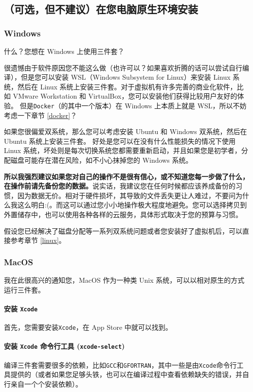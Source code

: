 \documentclass[a4paper]{ctexart}
\begin{document}
\subsection{（可选，但不建议）在您电脑原生环境安装}
\subsubsection{Windows}
什么？您想在 Windows 上使用三件套？

很遗憾由于软件原因您不能这么做（也许可以？如果喜欢折腾的话可以尝试自行编译），但是您可以安装 WSL（Windows Subsystem for Linux）来安装 Linux 系统，然后在 Linux 系统上安装三件套。对于虚拟机有许多完善的商业化软件，比如 VMware Workstation 和 VirtualBox，您可以安装他们获得比较用户友好的体验。
但是\texttt{Docker}（的其中一个版本）在 Windows 上本质上就是 WSL，所以不妨考虑一下章节 \ref{docker}？

如果您很偏爱双系统，那么您可以考虑安装 Ubuntu 和 Windows 双系统，然后在 Ubuntu 系统上安装三件套。
好处是您可以在没有什么性能损失的情况下使用 Linux 系统，坏处则是每次切换系统您都需要重新启动，并且如果您是初学者，分配磁盘可能存在潜在风险，如不小心抹掉您的 Windows 系统。

\textbf{所以我强烈建议如果您对自己的操作不是很有信心，或不知道您每一步做了什么，在操作前请先备份您的数据。}说实话，我建议您在任何时候都应该养成备份的习惯，因为数据无价。相对于硬件损坏，其导致的文件丢失更让人难过，不要问为什么我这么明白:(。而这可以通过您小小地操作极大程度地避免。您可以选择拷贝到外置储存中，也可以使用各种各样的云服务，具体形式取决于您的预算与习惯。

假设您已经解决了磁盘分配等一系列双系统问题或者您安装好了虚拟机后，可以直接参考章节 \ref{linux}。

\subsubsection{MacOS}
我在此很高兴的通知您，MacOS 作为一种类 Unix 系统，可以以相对原生的方式运行三件套。

\paragraph{安装 \texttt{Xcode}} 首先，您需要安装\texttt{Xcode}，在 App Store 中就可以找到。

\paragraph{安装 \texttt{Xcode} 命令行工具 (\texttt{xcode-select})} 编译三件套需要很多的依赖，比如\texttt{GCC}和\texttt{GFORTRAN}，其中一些是由\texttt{Xcode}命令行工具提供的（或者如果您足够头铁，也可以在编译过程中查看依赖缺失的错误，并自行亲自一个个安装依赖）。
\end{document}
